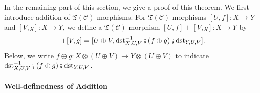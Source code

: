 In the remaining part of this section, we give a proof of this theorem.
We first introduce addition of $\mathfrak{T}(\mathcal{C})$-morphisms.
For $\mathfrak{T}(\mathcal{C})$-morphisms $[U,f] \colon X \to Y$
and $[V,g] \colon X \to Y$, we define a $\mathfrak{T}(\mathcal{C})$-morphism
$[U,f] + [V,g] \colon X \to Y$ by
\begin{equation*}
  [U,f] + [V,g] = [U \oplus V, \mathrm{dst}_{X,U,V}^{-1}
  \fatsemi (f \oplus g) \fatsemi \mathrm{dst}_{Y,U,V}].
\end{equation*}
Below, we write
$f \oplus g \colon X \otimes (U \oplus V) \to Y \otimes (U \oplus
V)$ to indicate
$\mathrm{dst}_{X,U,V}^{-1} \fatsemi (f \oplus g) \fatsemi
\mathrm{dst}_{Y,U,V}$.


\paragraph{Well-definedness of Addition}


